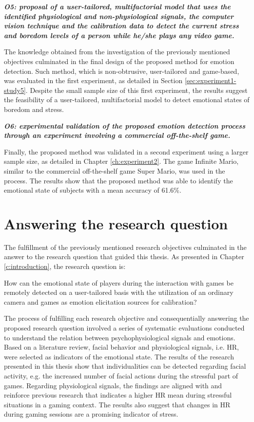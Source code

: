 \textit{\textbf{O5: proposal of a user-tailored, multifactorial model that uses the identified physiological and non-physiological signals, the computer vision technique and the calibration data to detect the current stress and boredom levels of a person while he/she plays any video game.}}

The knowledge obtained from the investigation of the previously mentioned objectives culminated in the final design of the proposed method for emotion detection. Such method, which is non-obtrusive, user-tailored and game-based, was evaluated in the first experiment, as detailed in Section \ref{sec:experiment1-study5}. Despite the small sample size of this first experiment, the results suggest the feasibility of a user-tailored, multifactorial model to detect emotional states of boredom and stress.

\textit{\textbf{O6: experimental validation of the proposed emotion detection process through an experiment involving a commercial off-the-shelf game.}}

Finally, the proposed method was validated in a second experiment using a larger sample size, as detailed in Chapter \ref{ch:experiment2}. The game Infinite Mario, similar to the commercial off-the-shelf game Super Mario, was used in the process. The results show that the proposed method was able to identify the emotional state of subjects with a mean accuracy of 61.6\%.

\section{Answering the research question}

The fulfillment of the previously mentioned research objectives culminated in the answer to the research question that guided this thesis. As presented in Chapter \ref{c:introduction}, the research question is:

\begin{fquote}
How can the emotional state of players during the interaction with games be remotely detected on a user-tailored basis with the utilization of an ordinary camera and games as emotion elicitation sources for calibration?
\end{fquote}

The process of fulfilling each research objective and consequentially answering the proposed research question involved a series of systematic evaluations conducted to understand the relation between psychophysiological signals and emotions. Based on a literature review, facial behavior and physiological signals, i.e. HR, were selected as indicators of the emotional state. The results of the research presented in this thesis show that individualities can be detected regarding facial activity, e.g. the increased number of facial actions during the stressful part of games. Regarding physiological signals, the findings are aligned with and reinforce previous research that indicates a higher HR mean during stressful situations in a gaming context. The results also suggest that changes in HR during gaming sessions are a promising indicator of stress.

